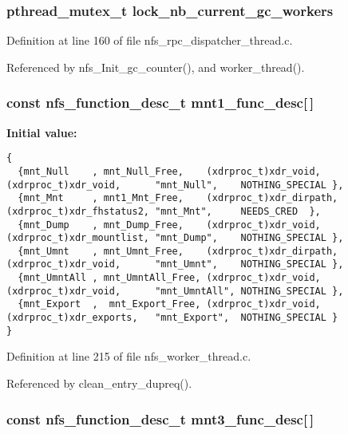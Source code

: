 \subsubsection{\setlength{\rightskip}{0pt plus 5cm}pthread\_\-mutex\_\-t {\bf lock\_\-nb\_\-current\_\-gc\_\-workers}}\label{nfs__worker__thread_8c_a7}




Definition at line 160 of file nfs\_\-rpc\_\-dispatcher\_\-thread.c.

Referenced by nfs\_\-Init\_\-gc\_\-counter(), and worker\_\-thread().
\subsubsection{\setlength{\rightskip}{0pt plus 5cm}const nfs\_\-function\_\-desc\_\-t {\bf mnt1\_\-func\_\-desc}[$\,$]}\label{nfs__worker__thread_8c_a15}


{\bf Initial value:}

\footnotesize\begin{verbatim}
{
  {mnt_Null    , mnt_Null_Free,    (xdrproc_t)xdr_void,    (xdrproc_t)xdr_void,      "mnt_Null",    NOTHING_SPECIAL },
  {mnt_Mnt     , mnt1_Mnt_Free,    (xdrproc_t)xdr_dirpath, (xdrproc_t)xdr_fhstatus2, "mnt_Mnt",     NEEDS_CRED  },
  {mnt_Dump    , mnt_Dump_Free,    (xdrproc_t)xdr_void,    (xdrproc_t)xdr_mountlist, "mnt_Dump",    NOTHING_SPECIAL },
  {mnt_Umnt    , mnt_Umnt_Free,    (xdrproc_t)xdr_dirpath, (xdrproc_t)xdr_void,      "mnt_Umnt",    NOTHING_SPECIAL },
  {mnt_UmntAll , mnt_UmntAll_Free, (xdrproc_t)xdr_void,    (xdrproc_t)xdr_void,      "mnt_UmntAll", NOTHING_SPECIAL },
  {mnt_Export  ,  mnt_Export_Free, (xdrproc_t)xdr_void,    (xdrproc_t)xdr_exports,   "mnt_Export",  NOTHING_SPECIAL }
}
\end{verbatim}\normalsize 


Definition at line 215 of file nfs\_\-worker\_\-thread.c.

Referenced by clean\_\-entry\_\-dupreq().
\subsubsection{\setlength{\rightskip}{0pt plus 5cm}const nfs\_\-function\_\-desc\_\-t {\bf mnt3\_\-func\_\-desc}[$\,$]}\label{nfs__worker__thread_8c_a16}


